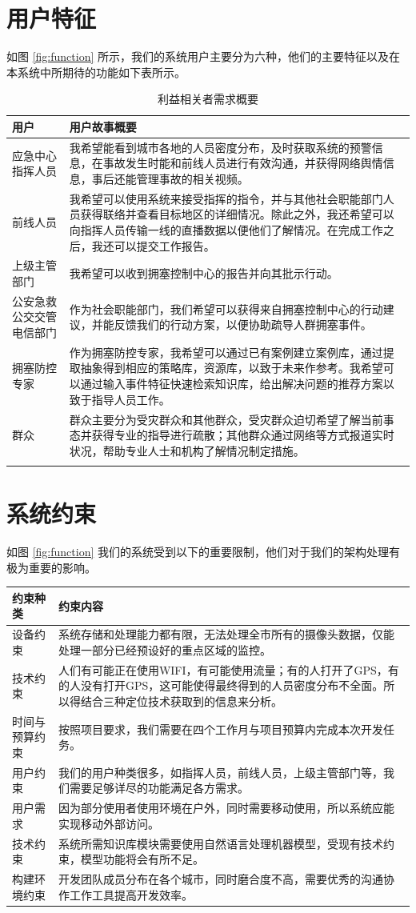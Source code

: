 \documentclass{ctexrep}
\begin{document}
\section{用户特征}
如图 \ref{fig:function} 所示，我们的系统用户主要分为六种，他们的主要特征以及在本系统中所期待的功能如下表所示。
\begin{longtable}{p{2cm}|p{10cm}}
\hline
用户 & 用户故事概要 \\
\hline
\hline
应急中心指挥人员 & 我希望能看到城市各地的人员密度分布，及时获取系统的预警信息，在事故发生时能和前线人员进行有效沟通，并获得网络舆情信息，事后还能管理事故的相关视频。\\
\hline
前线人员 & 我希望可以使用系统来接受指挥的指令，并与其他社会职能部门人员获得联络并查看目标地区的详细情况。除此之外，我还希望可以向指挥人员传输一线的直播数据以便他们了解情况。在完成工作之后，我还可以提交工作报告。\\
\hline
上级主管部门 & 我希望可以收到拥塞控制中心的报告并向其批示行动。 \\
\hline
公安急救公交交管电信部门 & 作为社会职能部门，我们希望可以获得来自拥塞控制中心的行动建议，并能反馈我们的行动方案，以便协助疏导人群拥塞事件。 \\
\hline
拥塞防控专家 & 作为拥塞防控专家，我希望可以通过已有案例建立案例库，通过提取抽象得到相应的策略库，资源库，以致于未来作参考。我希望可以通过输入事件特征快速检索知识库，给出解决问题的推荐方案以致于指导人员工作。\\
\hline
群众 & 群众主要分为受灾群众和其他群众，受灾群众迫切希望了解当前事态并获得专业的指导进行疏散；其他群众通过网络等方式报道实时状况，帮助专业人士和机构了解情况制定措施。\\
\hline
\caption{\label{tab:stakeholder} 利益相关者需求概要}
\end{longtable}
\section{系统约束}
如图 \ref{fig:function} 我们的系统受到以下的重要限制，他们对于我们的架构处理有极为重要的影响。
\begin{longtable}{p{2cm}|p{10cm}}
\hline
约束种类 & 约束内容 \\
\hline
\hline
 设备约束& 系统存储和处理能力都有限，无法处理全市所有的摄像头数据，仅能处理一部分已经预设好的重点区域的监控。\\
\hline
技术约束 & 人们有可能正在使用WIFI，有可能使用流量；有的人打开了GPS，有的人没有打开GPS，这可能使得最终得到的人员密度分布不全面。所以得结合三种定位技术获取到的信息来分析。\\
\hline
时间与预算约束& 按照项目要求，我们需要在四个工作月与项目预算内完成本次开发任务。 \\
\hline
用户约束 & 我们的用户种类很多，如指挥人员，前线人员，上级主管部门等，我们需要足够详尽的功能满足各方需求。\\
\hline
用户需求 & 因为部分使用者使用环境在户外，同时需要移动使用，所以系统应能实现移动外部访问。\\
\hline
技术约束 & 系统所需知识库模块需要使用自然语言处理机器模型，受现有技术约束，模型功能将会有所不足。\\
\hline
构建环境约束 & 开发团队成员分布在各个城市，同时磨合度不高，需要优秀的沟通协作工作工具提高开发效率。\\
\hline
\end{longtable}
\end{document}
